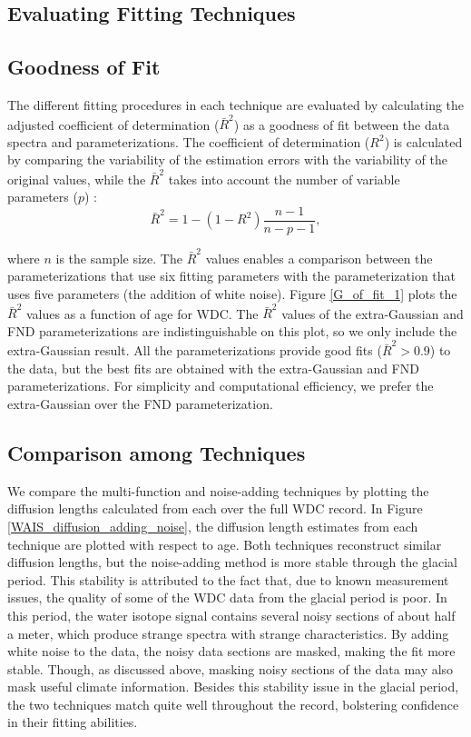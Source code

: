 \documentclass[draft, jgrga]{AGUTeX}
\begin{document}
\begin{article}
\section{Evaluating Fitting Techniques}
\subsection{Goodness of Fit}
The different fitting procedures in each technique are evaluated by calculating the adjusted coefficient of determination ($\bar{R}^2$) as a goodness of fit between the data spectra and parameterizations. The coefficient of determination ($R^2$) is calculated by comparing the variability of the estimation errors with the variability of the original values, while the $\bar{R}^2$ takes into account the number of variable parameters ($p$) \citep{Theil1961}:
\begin{equation}
\bar{R}^2 = 1 - (1 -R^2) \frac{n - 1}{n - p - 1},
\end{equation}

\noindent where $n$ is the sample size.
The $\bar{R}^2$ values enables a comparison between the parameterizations that use six fitting parameters with the parameterization that uses five parameters (the addition of white noise). Figure \ref{G_of_fit_1} plots the $\bar{R}^2$ values as a function of age for WDC. The $\bar{R}^2$ values of the extra-Gaussian and FND parameterizations are indistinguishable on this plot, so we only include the extra-Gaussian result. All the parameterizations provide good fits ($\bar{R}^2 > 0.9$) to the data, but the best fits are obtained with the extra-Gaussian and FND parameterizations. For simplicity and computational efficiency, we prefer the extra-Gaussian over the FND parameterization.

\subsection{Comparison among Techniques}
We compare the multi-function and noise-adding techniques by plotting the diffusion lengths calculated from each over the full WDC record. In Figure \ref{WAIS_diffusion_adding_noise}, the diffusion length estimates from each technique are plotted with respect to age. Both techniques reconstruct similar diffusion lengths, but the noise-adding method is more stable through the glacial period. This stability is attributed to the fact that, due to known measurement issues, the quality of some of the WDC data from the glacial period is poor. In this period, the water isotope signal contains several noisy sections of about half a meter, which produce strange spectra with strange characteristics. By adding white noise to the data, the noisy data sections are masked, making the fit more stable. Though, as discussed above, masking noisy sections of the data may also mask useful climate information. Besides this stability issue in the glacial period, the two techniques match quite well throughout the record, bolstering confidence in their fitting abilities.


\end{article}
\end{document}
